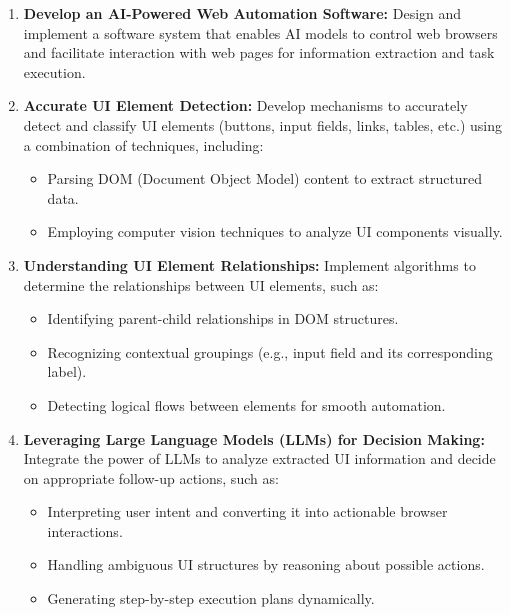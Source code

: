 \documentclass[conference]{IEEEtran}
\begin{document}
\begin{enumerate}
    \item \textbf{Develop an AI-Powered Web Automation Software:}
          Design and implement a software system that enables AI models to control web browsers and facilitate interaction with web pages for information extraction and task execution.

    \item \textbf{Accurate UI Element Detection:}
          Develop mechanisms to accurately detect and classify UI elements (buttons, input fields, links, tables, etc.) using a combination of techniques, including:
          \begin{itemize}
              \item Parsing DOM (Document Object Model) content to extract structured data.
              \item Employing computer vision techniques to analyze UI components visually.
          \end{itemize}

    \item \textbf{Understanding UI Element Relationships:}
          Implement algorithms to determine the relationships between UI elements, such as:
          \begin{itemize}
              \item Identifying parent-child relationships in DOM structures.
              \item Recognizing contextual groupings (e.g., input field and its corresponding label).
              \item Detecting logical flows between elements for smooth automation.
          \end{itemize}

    \item \textbf{Leveraging Large Language Models (LLMs) for Decision Making:}
          Integrate the power of LLMs to analyze extracted UI information and decide on appropriate follow-up actions, such as:
          \begin{itemize}
              \item Interpreting user intent and converting it into actionable browser interactions.
              \item Handling ambiguous UI structures by reasoning about possible actions.
              \item Generating step-by-step execution plans dynamically.
          \end{itemize}


\end{enumerate}
\end{document}
